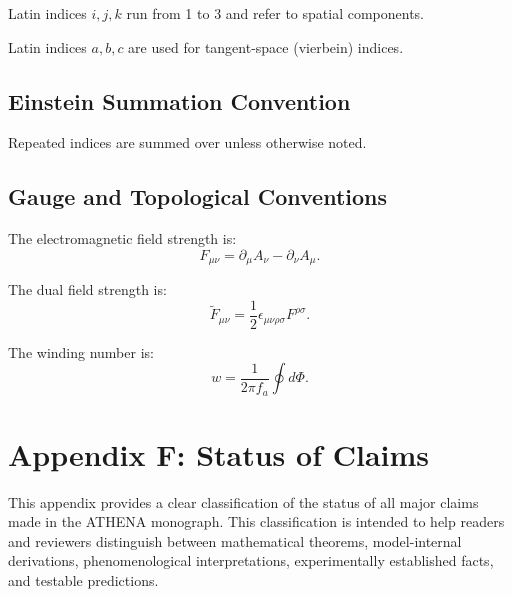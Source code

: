 \documentclass[12pt,oneside]{book}
\begin{document}
Latin indices $i, j, k$ run from 1 to 3 and refer to spatial components.

Latin indices $a, b, c$ are used for tangent-space (vierbein) indices.

\section{Einstein Summation Convention}

Repeated indices are summed over unless otherwise noted.

\section{Gauge and Topological Conventions}

The electromagnetic field strength is:
\[
F_{\mu\nu} = \partial_\mu A_\nu - \partial_\nu A_\mu.
\]

The dual field strength is:
\[
\tilde{F}_{\mu\nu} = \frac{1}{2}\epsilon_{\mu\nu\rho\sigma} F^{\rho\sigma}.
\]

The winding number is:
\[
w = \frac{1}{2\pi f_a} \oint d\Phi.
\]

\chapter{Appendix F: Status of Claims}

This appendix provides a clear classification of the status of all major claims made in the ATHENA monograph. This classification is intended to help readers and reviewers distinguish between mathematical theorems, model-internal derivations, phenomenological interpretations, experimentally established facts, and testable predictions.
\end{document}
